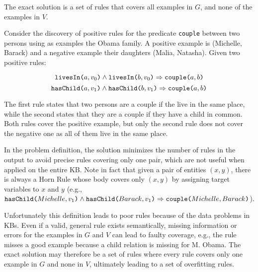 The exact solution is a set of rules that covers all examples in $G$, and none of the examples in $V$. 

\begin{example}
	Consider the discovery of positive rules for the predicate {\tt couple} between two persons using as examples the Obama family. A positive example is (Michelle, Barack) and a negative example their daughters (Malia, Natasha). 
	Given two positive rules:
	
	\vspace{-2mm}	
	{\small	
		\begin{equation*}
			\texttt{livesIn(}a,v_0\texttt{)} \wedge \texttt{livesIn(}b,v_0\texttt{)} \Rightarrow  \texttt{couple(}a,b\texttt{)}  
		\end{equation*}
		\begin{equation*}
			\texttt{hasChild(}a,v_1\texttt{)} \wedge \texttt{hasChild(}b,v_1\texttt{)} \Rightarrow  \texttt{couple(}a,b\texttt{)}  
		\end{equation*}
	}
	\vspace{-3mm}	
	
	\noindent
	The first rule states that two persons are a couple if the live in the same place, while the second states that they are a couple if they have a child in common. Both rules cover the positive example, but only the second rule does not cover the negative one as all of them live in the same place. 
\end{example} 

\vspace{1ex}	
In the problem definition, the solution minimizes the number of rules in the output to avoid precise rules covering only one pair, which are not useful when applied on the entire KB. Note in fact that given a pair of entities $(x,y)$, there is always a Horn Rule whose body covers only $(x,y)$ by assigning target variables to $x$ and $y$ (e.g., {\small $\texttt{hasChild(}Michelle,v_1\texttt{)} \wedge \texttt{hasChild(}Barack,v_1\texttt{)} \Rightarrow  \texttt{couple(}Michelle,Barack\texttt{)}$}).


Unfortunately
this definition leads to poor rules because of the data problems in KBs. Even if a valid, general rule exists semantically, missing information or errors for the examples in $G$ and $V$ can lead to faulty coverage, e.g., the rule misses a good example because a child relation is missing for M. Obama. %
The exact solution may therefore be a set of rules where every rule covers only one example in $G$ and none in $V$, ultimately leading to a set of overfitting rules.


